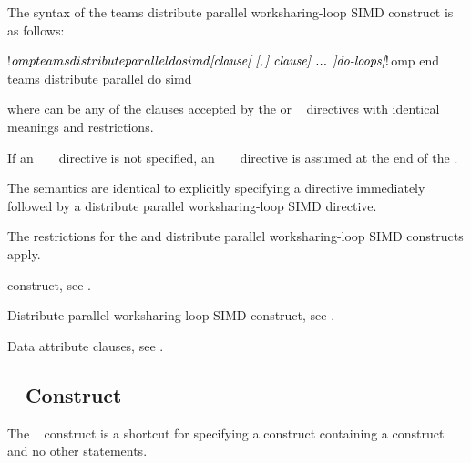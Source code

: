 \begin{fortranspecific}
The syntax of the teams distribute parallel worksharing-loop SIMD construct 
is as follows:

\begin{ompfPragma}
!$omp teams distribute parallel do simd \plc{[clause[ [},\plc{] clause] ... ]}
    \plc{do-loops}
\plc{[}!$omp end teams distribute parallel do simd\plc{]}
\end{ompfPragma}

where  can be any of the clauses accepted by the  or
  ~ directives with 
identical meanings and restrictions.

If an ~   ~ 
directive is not specified, an ~  
 ~ directive is assumed at the end of
the .
\end{fortranspecific}

\descr
The semantics are identical to explicitly specifying a  directive 
immediately followed by a distribute parallel worksharing-loop SIMD directive. 

\restrictions
The restrictions for the  and distribute parallel worksharing-loop
SIMD constructs apply.

\begin{crossrefs}
\item {} construct, see
.

\item Distribute parallel worksharing-loop SIMD construct, see
.

\item Data attribute clauses, see
.
\end{crossrefs}



\subsection{~ Construct}
\label{subsec:teams loop Construct}
\summary
The ~ construct is a shortcut for specifying a  
construct containing a  construct and no other statements.

